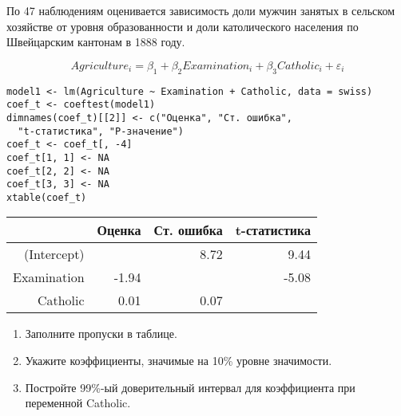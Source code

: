\begin{problem} %
По 47 наблюдениям оценивается зависимость доли мужчин занятых в сельском хозяйстве от уровня образованности и доли католического населения по Швейцарским кантонам в 1888 году.

\[
Agriculture_i=\beta_1+\beta_2 Examination_i+\beta_3 Catholic_i+\varepsilon_i
\]

\begin{verbatim}
model1 <- lm(Agriculture ~ Examination + Catholic, data = swiss)
coef_t <- coeftest(model1)
dimnames(coef_t)[[2]] <- c("Оценка", "Ст. ошибка",
  "t-статистика", "P-значение")
coef_t <- coef_t[, -4]
coef_t[1, 1] <- NA
coef_t[2, 2] <- NA
coef_t[3, 3] <- NA
xtable(coef_t)
\end{verbatim}

\begin{tabular}{rrrr}
  \hline
 & Оценка & Ст. ошибка & t-статистика \\
  \hline
(Intercept) &  & 8.72 & 9.44 \\
  Examination & -1.94 &  & -5.08 \\
  Catholic & 0.01 & 0.07 &  \\
   \hline
\end{tabular}



\begin{enumerate}
\item Заполните пропуски в таблице.
\item Укажите коэффициенты, значимые на 10\% уровне значимости.
\item Постройте 99\%-ый доверительный интервал для коэффициента при переменной Catholic.
\end{enumerate}

\begin{sol}
\end{sol}
\end{problem}


